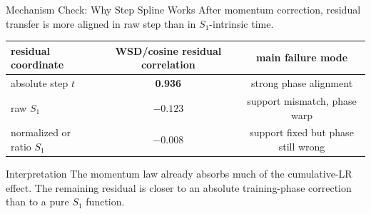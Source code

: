 \documentclass[fontset=fandol,aspectratio=169,10pt]{ctexbeamer}
\begin{document}
\begin{frame}{Mechanism Check: Why Step Spline Works}
  After momentum correction, residual transfer is more aligned in raw step than in \(S_1\)-intrinsic time.

  \begin{table}
    \centering
    \scriptsize
    \begin{tabular}{lcc}
      \toprule
      residual coordinate & WSD/cosine residual correlation & main failure mode\\
      \midrule
      absolute step \(t\) & \textbf{0.936} & strong phase alignment\\
      raw \(S_1\) & \(-0.123\) & support mismatch, phase warp\\
      normalized or ratio \(S_1\) & \(-0.008\) & support fixed but phase still wrong\\
      \bottomrule
    \end{tabular}
  \end{table}

  \begin{block}{Interpretation}
    The momentum law already absorbs much of the cumulative-LR effect. The remaining residual is closer to an absolute training-phase correction than to a pure \(S_1\) function.
  \end{block}
\end{frame}
\end{document}
